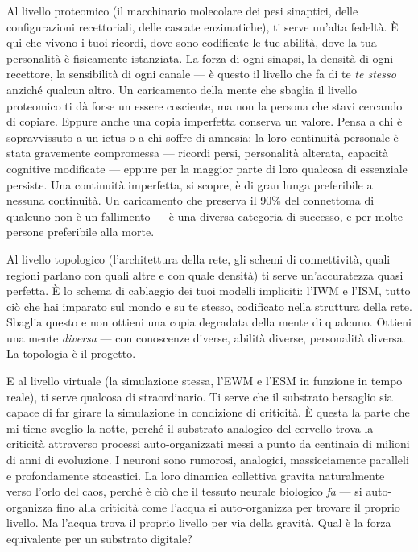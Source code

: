 \documentclass[11pt, twoside, openright]{book}
\begin{document}
Al livello proteomico (il macchinario molecolare dei pesi sinaptici, delle configurazioni recettoriali, delle cascate enzimatiche), ti serve un'alta fedeltà. È qui che vivono i tuoi ricordi, dove sono codificate le tue abilità, dove la tua personalità è fisicamente istanziata. La forza di ogni sinapsi, la densità di ogni recettore, la sensibilità di ogni canale --- è questo il livello che fa di te \textit{te stesso} anziché qualcun altro. Un caricamento della mente che sbaglia il livello proteomico ti dà forse un essere cosciente, ma non la persona che stavi cercando di copiare. Eppure anche una copia imperfetta conserva un valore. Pensa a chi è sopravvissuto a un ictus o a chi soffre di amnesia: la loro continuità personale è stata gravemente compromessa --- ricordi persi, personalità alterata, capacità cognitive modificate --- eppure per la maggior parte di loro qualcosa di essenziale persiste. Una continuità imperfetta, si scopre, è di gran lunga preferibile a nessuna continuità. Un caricamento che preserva il 90\% del connettoma di qualcuno non è un fallimento --- è una diversa categoria di successo, e per molte persone preferibile alla morte.

Al livello topologico (l'architettura della rete, gli schemi di connettività, quali regioni parlano con quali altre e con quale densità) ti serve un'accuratezza quasi perfetta. È lo schema di cablaggio dei tuoi modelli impliciti: l'IWM e l'ISM, tutto ciò che hai imparato sul mondo e su te stesso, codificato nella struttura della rete. Sbaglia questo e non ottieni una copia degradata della mente di qualcuno. Ottieni una mente \textit{diversa} --- con conoscenze diverse, abilità diverse, personalità diversa. La topologia è il progetto.

E al livello virtuale (la simulazione stessa, l'EWM e l'ESM in funzione in tempo reale), ti serve qualcosa di straordinario. Ti serve che il substrato bersaglio sia capace di far girare la simulazione in condizione di criticità. È questa la parte che mi tiene sveglio la notte, perché il substrato analogico del cervello trova la criticità attraverso processi auto-organizzati messi a punto da centinaia di milioni di anni di evoluzione. I neuroni sono rumorosi, analogici, massicciamente paralleli e profondamente stocastici. La loro dinamica collettiva gravita naturalmente verso l'orlo del caos, perché è ciò che il tessuto neurale biologico \textit{fa} --- si auto-organizza fino alla criticità come l'acqua si auto-organizza per trovare il proprio livello. Ma l'acqua trova il proprio livello per via della gravità. Qual è la forza equivalente per un substrato digitale?
\end{document}
